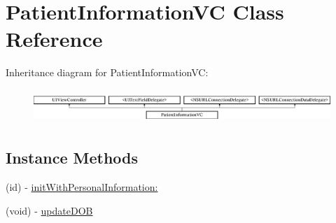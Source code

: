 \hypertarget{interface_patient_information_v_c}{\section{Patient\-Information\-V\-C Class Reference}
\label{interface_patient_information_v_c}
}
Inheritance diagram for Patient\-Information\-V\-C\-:\begin{figure}[H]
\begin{center}
\leavevmode
\includegraphics[height=1.308411cm]{interface_patient_information_v_c}
\end{center}
\end{figure}
\subsection*{Instance Methods}
\begin{DoxyCompactItemize}
\item 
(id) -\/ \hyperlink{interface_patient_information_v_c_ab98d9f44b4ee1c4b3051c017ebdac5c5}{init\-With\-Personal\-Information\-:}
\item 
(void) -\/ \hyperlink{interface_patient_information_v_c_ab6fee07f4777f557711e819c9a4cf3a4}{update\-D\-O\-B}
\end{DoxyCompactItemize}
